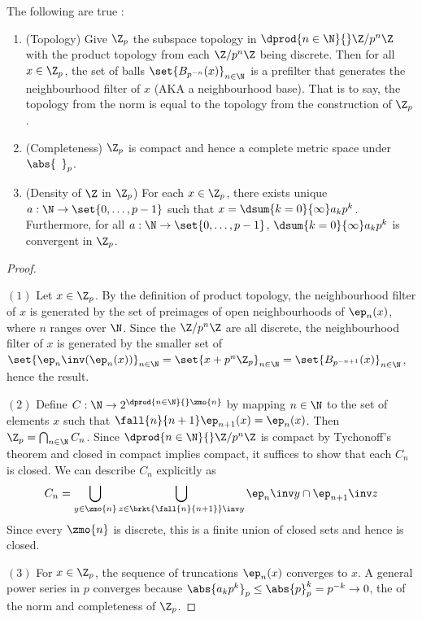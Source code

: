 \begin{prop}

  The following are true : 
  \begin{enumerate}
    \item (Topology) 
    Give $\Z_p$ the subspace topology in $\dprod{n \in \N}{}\Z/p^n\Z$ with 
    the product topology from each $\Z/p^n\Z$ being discrete. 
    Then for all $x \in \Z_p$, 
    the set of balls $\set{B_{p^{-n}}(x)}_{n \in \N}$ is 
    a prefilter that generates the neighbourhood filter of $x$
    (AKA a neighbourhood base). 
    That is to say, the topology from the norm is equal to 
    the topology from the construction of $\Z_p$. 
    \item (Completeness)
    $\Z_p$ is compact and
    hence a complete metric space under $\abs{\hspace{5pt}}_p$. 
    \item (Density of $\Z$ in $\Z_p$)
    For each $x \in \Z_p$, 
    there exists unique $a : \N \to \set{0,\dots,p-1}$ such that 
    $x = \dsum{k = 0}{\infty} a_k p^k$.
    Furthermore, for all $a : \N \to \set{0, \dots, p-1}$, 
    $\dsum{k = 0}{\infty} a_k p^k$ is convergent in $\Z_p$. 
  \end{enumerate}
\end{prop}
\begin{proof}~

  $(1)$ Let $x \in \Z_p$. 
  By the definition of product topology, 
  the neighbourhood filter of $x$ is generated by 
  the set of preimages of open neighbourhoods of $\ep_n(x)$, 
  where $n$ ranges over $\N$. 
  Since the $\Z/p^n\Z$ are all discrete, 
  the neighbourhood filter of $x$ is generated by the smaller set of 
  $\set{\ep_n\inv(\ep_n(x))}_{n \in \N} = \set{x + p^n\Z_p}_{n\in\N}
  = \set{B_{p^{-n+1}}(x)}_{n\in\N}$,
  hence the result.
  
  $(2)$ Define $C : \N \to 2^{\dprod{n\in\N}{}\zmo{n}}$
  by mapping $n \in \N$ to the set of elements $x$ such that 
  $\fall{n}{n+1}\ep_{n+1}(x) = \ep_n(x)$.
  Then $\Z_p = \bigcap_{n \in \N} C_n$. 
  Since $\dprod{n \in \N}{}\Z/p^n\Z$ is compact by Tychonoff's theorem
  and closed in compact implies compact, it suffices to show that
  each $C_n$ is closed. 
  We can describe $C_n$ explicitly as 
  \[
    C_n = \bigcup_{y \in \zmo{n}} 
    \bigcup_{z \in \brkt{\fall{n}{n+1}}\inv y} \ep_n\inv y \cap \ep_{n+1}\inv z
  \]
  Since every $\zmo{n}$ is discrete,
  this is a finite union of closed sets and hence is closed. 

  $(3)$ For $x \in \Z_p$, 
  the sequence of truncations $\ep_n(x)$ converges to $x$. 
  A general power series in $p$ converges because 
  $\abs{a_k p^k}_p \leq \abs{p}_p^k = p^{-k} \to 0$,
  the  of the norm
  and completeness of $\Z_p$. 
\end{proof}

